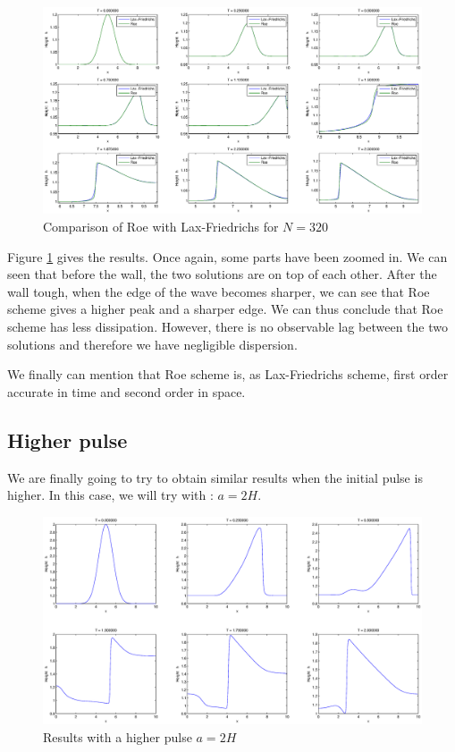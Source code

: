 \begin{figure}
\begin{center}
\includegraphics[scale=0.35]{roeComp.eps}
\caption{Comparison of Roe with Lax-Friedrichs for $N=320$}
\label{roeComp}
\end{center}
\end{figure}

Figure \ref{roeComp} gives the results. Once again, some parts have been zoomed in. We can seen that before the wall, the two solutions are on top of each other. After the wall tough, when the edge of the wave becomes sharper, we can see that Roe scheme gives a higher peak and a sharper edge. We can thus conclude that Roe scheme has less dissipation. However, there is no observable lag between the two solutions and therefore we have negligible dispersion.

We finally can mention that Roe scheme is, as Lax-Friedrichs scheme, first order accurate in time and second order in space.

\subsection{Higher pulse}
We are finally going to try to obtain similar results when the initial pulse is higher. In this case, we will try with : $a=2H$.

\begin{figure}
\begin{center}
\includegraphics[scale=0.35]{higher.eps}
\caption{Results with a higher pulse $a=2H$}
\label{higher}
\end{center}
\end{figure}


